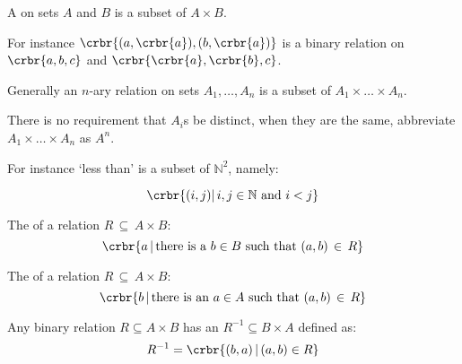 \documentclass[11pt]{article}
\begin{document}
{\item A  on sets $A$ and $B$ is a subset of $A \times B$.  

\item[] For instance $\crbr{(a,\crbr{a}),(b,\crbr{a})}$  is a binary relation on
$\crbr{a,b,c}$ and $\crbr{\crbr{a},\crbr{b},c}$.

\item Generally an $n$-ary relation on sets $A_1,\ldots,A_n$ is a subset of
$A_1\times\ldots\times A_n$.


\item There is no requirement that $A_i$s  be distinct, when they are the same,
abbreviate $A_1\times\ldots\times A_n$ as $A^n$.

\item[] For instance `less than' is a subset of $\mathbb{N}^2$, namely:

\[
\crbr{(i,j) |\, i,j \in \mathbb{N} \text{ and } i < j}
\]

\item The  of a relation $R\, \subseteq\, A\times B$:
\[
	\crbr{a\,|\, \text{there is a } b\in B \text{ such that }  (a,b)\, \in\, R}
\]

\item The  of a relation $R\, \subseteq\, A\times B$:
\[
	\crbr{b\,|\, \text{there is an } a\in A \text{ such that }  (a,b)\, \in\, R}
\]

\item Any binary relation $R\subseteq A\times B$ has an  $R^{-1}
\subseteq B\times A$ defined as:
\[
R^{-1}=\crbr{(b,a)\,|\, (a,b) \in R}
\]

}
\end{document}
